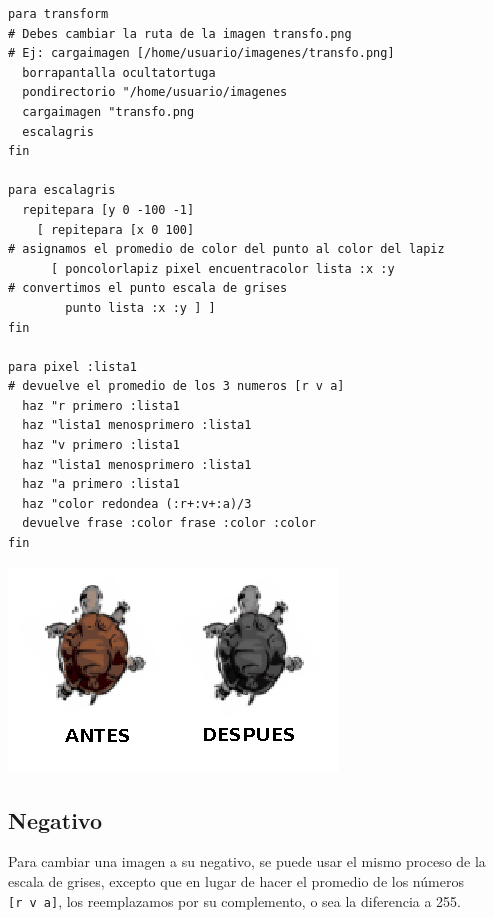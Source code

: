 \begin{verbatim}
para transform
# Debes cambiar la ruta de la imagen transfo.png
# Ej: cargaimagen [/home/usuario/imagenes/transfo.png]
  borrapantalla ocultatortuga
  pondirectorio "/home/usuario/imagenes
  cargaimagen "transfo.png
  escalagris
fin

para escalagris
  repitepara [y 0 -100 -1]
    [ repitepara [x 0 100]
# asignamos el promedio de color del punto al color del lapiz
      [ poncolorlapiz pixel encuentracolor lista :x :y
# convertimos el punto escala de grises 
        punto lista :x :y ] ]
fin

para pixel :lista1
# devuelve el promedio de los 3 numeros [r v a]
  haz "r primero :lista1 
  haz "lista1 menosprimero :lista1 
  haz "v primero :lista1 
  haz "lista1 menosprimero :lista1 
  haz "a primero :lista1 
  haz "color redondea (:r+:v+:a)/3
  devuelve frase :color frase :color :color 
fin \end{verbatim}
\begin{center}
  \includegraphics[scale=0.6]{Imagenes/13_Ejemplos/colores1.png}
\end{center}

\subsection{Negativo}
   \label{Colores-Negativo}

Para cambiar una imagen a su negativo, se puede usar el mismo proceso
de la escala de grises, excepto que en lugar de hacer el promedio
de los n\'umeros \texttt{[r~v~a]}, los reemplazamos por su complemento,
o sea la diferencia a 255. 

